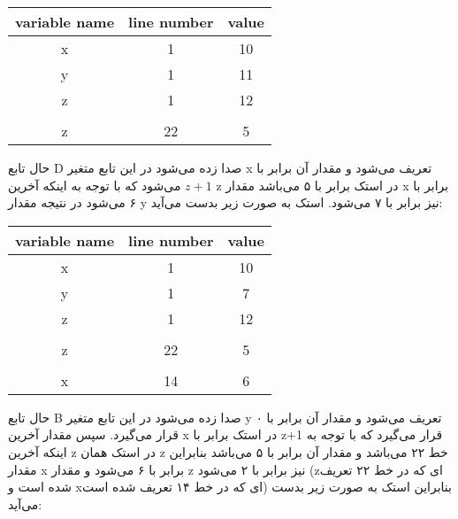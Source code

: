 \begin{latin}
	\begin{center}
		\begin{tabular}{|c|c|c|}
			\hline
			variable name & line number & value\\
			\hline
			x & 1 & 10\\
			\hline
			y & 1 & 11\\
			\hline
			z & 1 & 12\\
			\hline
			\rowcolor{black} \multicolumn{3}{|c|}{}\\
			\hline
			z & 22 & 5\\
			\hline
		\end{tabular}
	\end{center}
\end{latin}

حال تابع D صدا زده می‌شود در این تابع متغیر x تعریف می‌شود و مقدار آن برابر با $z+1$ می‌شود که با توجه به اینکه آخرین z در استک برابر با ۵ می‌باشد مقدار x برابر با ۶ می‌شود در نتیجه مقدار y نیز برابر با ۷ می‌شود. استک به صورت زیر بدست می‌آید:
\begin{latin}
	\begin{center}
		\begin{tabular}{|c|c|c|}
			\hline
			variable name & line number & value\\
			\hline
			x & 1 & 10\\
			\hline
			y & 1 & 7\\
			\hline
			z & 1 & 12\\
			\hline
			\rowcolor{black} \multicolumn{3}{|c|}{}\\
			\hline
			z & 22 & 5\\
			\hline
			\rowcolor{black} \multicolumn{3}{|c|}{}\\
			\hline
			x & 14 & 6\\
			\hline
		\end{tabular}
	\end{center}
\end{latin}
حال تابع B صدا زده می‌شود در این تابع متغیر y تعریف می‌شود و مقدار آن برابر با ۰ قرار می‌گیرد. سپس مقدار آخرین x در استک برابر با z+1 قرار می‌گیرد که با توجه به اینکه آخرین z در استک همان z خط ۲۲ می‌باشد و مقدار آن برابر با ۵ می‌باشد بنابراین مقدار x برابر با ۶ می‌‌شود و مقدار z نیز برابر با ۲ می‌شود (zای که در خط ۲۲ تعریف شده است و xای که در خط ۱۴ تعریف شده است) بنابراین استک به صورت زیر بدست می‌آید:
